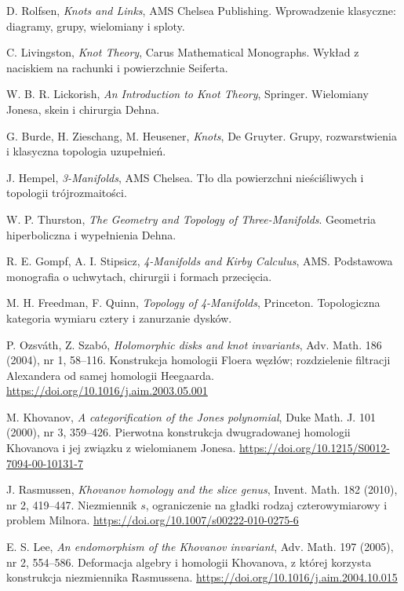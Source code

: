 \begin{enumerate}[label={[\arabic*]},leftmargin=*,itemsep=3pt]
\item D. Rolfsen, \emph{Knots and Links}, AMS Chelsea Publishing.
Wprowadzenie klasyczne: diagramy, grupy, wielomiany i sploty.
\item C. Livingston, \emph{Knot Theory}, Carus Mathematical Monographs.
Wykład z naciskiem na rachunki i powierzchnie Seiferta.
\item W. B. R. Lickorish, \emph{An Introduction to Knot Theory}, Springer.
Wielomiany Jonesa, skein i chirurgia Dehna.
\item G. Burde, H. Zieschang, M. Heusener, \emph{Knots}, De Gruyter.
Grupy, rozwarstwienia i klasyczna topologia uzupełnień.
\item J. Hempel, \emph{3-Manifolds}, AMS Chelsea.
Tło dla powierzchni nieściśliwych i topologii trójrozmaitości.
\item W. P. Thurston, \emph{The Geometry and Topology of Three-Manifolds}.
Geometria hiperboliczna i wypełnienia Dehna.
\item R. E. Gompf, A. I. Stipsicz, \emph{4-Manifolds and Kirby Calculus}, AMS.
Podstawowa monografia o uchwytach, chirurgii i formach przecięcia.
\item M. H. Freedman, F. Quinn, \emph{Topology of 4-Manifolds}, Princeton.
Topologiczna kategoria wymiaru cztery i zanurzanie dysków.
\item P. Ozsváth, Z. Szabó, \emph{Holomorphic disks and knot invariants},
Adv. Math. 186 (2004), nr 1, 58--116.
Konstrukcja homologii Floera węzłów;
rozdzielenie filtracji Alexandera od samej homologii Heegaarda.
\url{https://doi.org/10.1016/j.aim.2003.05.001}
\item M. Khovanov, \emph{A categorification of the Jones polynomial},
Duke Math. J. 101 (2000), nr 3, 359--426.
Pierwotna konstrukcja dwugradowanej homologii Khovanova
i jej związku z wielomianem Jonesa.
\url{https://doi.org/10.1215/S0012-7094-00-10131-7}
\item J. Rasmussen, \emph{Khovanov homology and the slice genus},
Invent. Math. 182 (2010), nr 2, 419--447.
Niezmiennik $s$, ograniczenie na gładki rodzaj
czterowymiarowy i problem Milnora.
\url{https://doi.org/10.1007/s00222-010-0275-6}
\item E. S. Lee, \emph{An endomorphism of the Khovanov invariant},
Adv. Math. 197 (2005), nr 2, 554--586.
Deformacja algebry i homologii Khovanova, z której
korzysta konstrukcja niezmiennika Rasmussena.
\url{https://doi.org/10.1016/j.aim.2004.10.015}

\end{enumerate}
